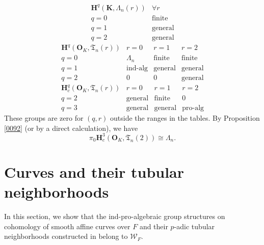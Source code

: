 \documentclass{amsart}
\theoremstyle{remark}
\numberwithin{equation}{section}
\newcommand{\alg}[1]{\mathbf{#1}}
\begin{document}
	\[
		\begin{array}{c|c}
				\alg{H}^{q}(\alg{K}, \Lambda_{n}(r))
			&
				\forall r
			\\ \hline
				q = 0
			&
				\text{finite}
			\\
				q = 1
			&
				\text{general}
			\\
				q = 2
			&
				\text{general}
		\end{array}
	\]
	\[
		\begin{array}{c|ccc}
				\alg{H}^{q}(\alg{O}_{K}, \mathfrak{T}_{n}(r))
			&
				r = 0
			&
				r = 1
			&
				r = 2
			\\ \hline
				q = 0
			&
				\Lambda_{n}
			&
				\text{finite}
			&
				\text{finite}
			\\
				q = 1
			&
				\text{ind-alg}
			&
				\text{general}
			&
				\text{general}
			\\
				q = 2
			&
				0
			&
				0
			&
				\text{general}
		\end{array}
	\]
	\[
		\begin{array}{c|ccc}
				\alg{H}^{q}_{c}(\alg{O}_{K}, \mathfrak{T}_{n}(r))
			&
				r = 0
			&
				r = 1
			&
				r = 2
			\\ \hline
				q = 2
			&
				\text{general}
			&
				\text{finite}
			&
				0
			\\
				q = 3
			&
				\text{general}
			&
				\text{general}
			&
				\text{pro-alg}
		\end{array}
	\]
These groups are zero for $(q, r)$ outside the ranges in the tables.
By Proposition \ref{0092} (or by a direct calculation),
we have
	\begin{equation} \label{0093}
			\pi_{0} \alg{H}^{3}_{c}(\alg{O}_{K}, \mathfrak{T}_{n}(2))
		\cong
			\Lambda_{n}.
	\end{equation}


\section{Curves and their tubular neighborhoods}
\label{0059}

In this section, we show that
the ind-pro-algebraic group structures on cohomology of smooth affine curves over $F$
and their $p$-adic tubular neighborhoods
constructed in \cite[Section 9]{Suz24} belong to $\mathcal{W}_{F}$.
\end{document}
